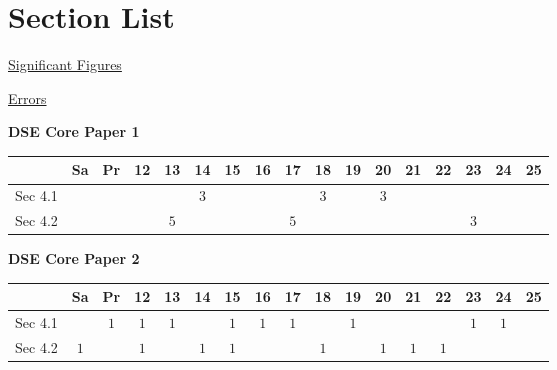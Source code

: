 \documentclass[12pt, a4paper]{article}
\begin{document}
\section*{Section List}
\begin{enumx}[label=Sec 4.\arabic*\ ]
\item \hyperref[section:2-4-1]{Significant Figures}
\item \hyperref[section:2-4-2]{Errors}
\end{enumx}
\begin{absolutelynopagebreak}
\begin{center}
\textbf{DSE Core Paper 1}
\end{center}
\begin{center}
\begin{tabular}{|l|c|c|c|c|c|c|c|c|c|c|c|c|c|c|c|c|}
\hline
        & Sa & Pr & 12 & 13 & 14 & 15 & 16 & 17 & 18 & 19 & 20 & 21 & 22 & 23 & 24 & 25 \\\hline\hline
Sec 4.1 &  &  &  &  &  $3$ &  &  &  &  $3$ &  &  $3$ &  &  &  &  &  \\\hline
Sec 4.2 &  &  &  &  $5$ &  &  &  &  $5$ &  &  &  &  &  &  $3$ &  &  \\\hline
\end{tabular}
\end{center}
\end{absolutelynopagebreak}
\begin{absolutelynopagebreak}
\begin{center}
\textbf{DSE Core Paper 2}
\end{center}
\begin{center}
\begin{tabular}{|l|c|c|c|c|c|c|c|c|c|c|c|c|c|c|c|c|}
\hline
        & Sa & Pr & 12 & 13 & 14 & 15 & 16 & 17 & 18 & 19 & 20 & 21 & 22 & 23 & 24 & 25 \\\hline\hline
Sec 4.1 &  &  $1$ &  $1$ &  $1$ &  &  $1$ &  $1$ &  $1$ &  &  $1$ &  &  &  &  $1$ &  $1$ &  \\\hline
Sec 4.2 &  $1$ &  &  $1$ &  &  $1$ &  $1$ &  &  &  $1$ &  &  $1$ &  $1$ &  $1$ &  &  &  \\\hline
\end{tabular}
\end{center}
\end{absolutelynopagebreak}
\end{document}
